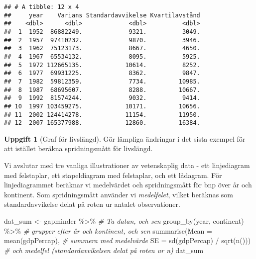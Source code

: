 \documentclass[
]{book}
\newenvironment{Shaded}{\begin{snugshade}}{\end{snugshade}}
\newcommand{\AttributeTok}[1]{\textcolor[rgb]{0.77,0.63,0.00}{#1}}
\newcommand{\CommentTok}[1]{\textcolor[rgb]{0.56,0.35,0.01}{\textit{#1}}}
\newcommand{\FunctionTok}[1]{\textcolor[rgb]{0.00,0.00,0.00}{#1}}
\newcommand{\NormalTok}[1]{#1}
\newcommand{\OtherTok}[1]{\textcolor[rgb]{0.56,0.35,0.01}{#1}}
\newcommand{\SpecialCharTok}[1]{\textcolor[rgb]{0.00,0.00,0.00}{#1}}
\theoremstyle{definition}
\theoremstyle{definition}
\theoremstyle{definition}
\newtheorem{exercise}{Uppgift}[chapter]
\theoremstyle{definition}
\theoremstyle{remark}
\begin{document}
\begin{verbatim}
## # A tibble: 12 x 4
##     year    Varians Standardavvikelse Kvartilavstånd
##    <dbl>      <dbl>             <dbl>          <dbl>
##  1  1952  86882249.             9321.          3049.
##  2  1957  97410232.             9870.          3946.
##  3  1962  75123173.             8667.          4650.
##  4  1967  65534132.             8095.          5925.
##  5  1972 112665135.            10614.          8252.
##  6  1977  69931225.             8362.          9847.
##  7  1982  59812359.             7734.         10985.
##  8  1987  68695607.             8288.         10667.
##  9  1992  81574244.             9032.          9414.
## 10  1997 103459275.            10171.         10656.
## 11  2002 124414278.            11154.         11950.
## 12  2007 165377988.            12860.         16384.
\end{verbatim}

\begin{exercise}[Graf för livslängd]
Gör lämpliga ändringar i det sista exempel för att istället beräkna spridningsmått för livslängd.
\end{exercise}

Vi avslutar med tre vanliga illustrationer av vetenskaplig data - ett linjediagram med felstaplar, ett stapeldiagram med felstaplar, och ett lådagram. För linjediagrammet beräknar vi medelvärdet och spridningsmått för bnp över år och kontinent. Som spridningsmått använder vi \emph{medelfelet}, vilket beräknas som standardavvikelse delat på roten ur antalet observationer.

\begin{Shaded}
\begin{Highlighting}[]
\NormalTok{dat\_sum }\OtherTok{\textless{}{-}}\NormalTok{ gapminder }\SpecialCharTok{\%\textgreater{}\%}                         \CommentTok{\# Ta datan, och sen}
  \FunctionTok{group\_by}\NormalTok{(year, continent) }\SpecialCharTok{\%\textgreater{}\%}                  \CommentTok{\# grupper efter år och kontinent, och sen}
  \FunctionTok{summarise}\NormalTok{(}\AttributeTok{Mean =} \FunctionTok{mean}\NormalTok{(gdpPercap),              }\CommentTok{\# summera med medelvärde}
            \AttributeTok{SE =} \FunctionTok{sd}\NormalTok{(gdpPercap) }\SpecialCharTok{/} \FunctionTok{sqrt}\NormalTok{(}\FunctionTok{n}\NormalTok{()))      }\CommentTok{\# och medelfel (standardavvikelsen delat på roten ur n)}
\NormalTok{dat\_sum}
\end{Highlighting}
\end{Shaded}
\end{document}
